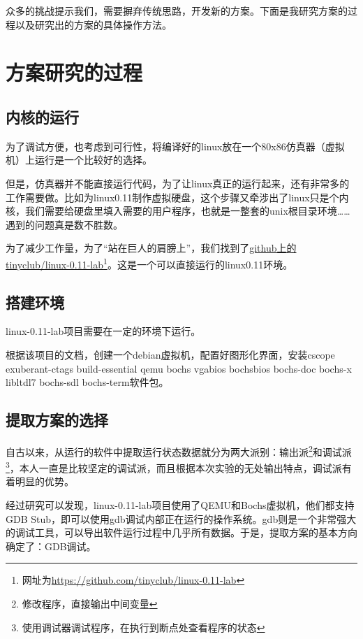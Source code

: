 \documentclass[]{report}
\begin{document}
众多的挑战提示我们，需要摒弃传统思路，开发新的方案。下面是我研究方案的过程以及研究出的方案的具体操作方法。

\section{方案研究的过程}

\subsection{内核的运行}

为了调试方便，也考虑到可行性，将编译好的linux放在一个80x86仿真器（虚拟机）上运行是一个比较好的选择。

但是，仿真器并不能直接运行代码，为了让linux真正的运行起来，还有非常多的工作需要做。比如为linux0.11制作虚拟硬盘，这个步骤又牵涉出了linux只是个内核，我们需要给硬盘里填入需要的用户程序，也就是一整套的unix根目录环境……遇到的问题真是数不胜数。

为了减少工作量，为了“站在巨人的肩膀上”，我们找到了\href{https://github.com/tinyclub/linux-0.11-lab}{github上的tinyclub/linux-0.11-lab}\footnote{网址为\url{https://github.com/tinyclub/linux-0.11-lab}}。这是一个可以直接运行的linux0.11环境。

\subsection{搭建环境}

linux-0.11-lab项目需要在一定的环境下运行。

根据该项目的文档，创建一个debian虚拟机，配置好图形化界面，安装cscope exuberant-ctags build-essential qemu bochs vgabios bochsbios bochs-doc bochs-x libltdl7 bochs-sdl bochs-term软件包。

\subsection{提取方案的选择}

自古以来，从运行的软件中提取运行状态数据就分为两大派别：输出派\footnote{修改程序，直接输出中间变量}和调试派\footnote{使用调试器调试程序，在执行到断点处查看程序的状态}，本人一直是比较坚定的调试派，而且根据本次实验的无处输出特点，调试派有着明显的优势。

经过研究可以发现，linux-0.11-lab项目使用了QEMU和Bochs虚拟机，他们都支持GDB Stub，即可以使用gdb调试内部正在运行的操作系统。gdb则是一个非常强大的调试工具，可以导出软件运行过程中几乎所有数据。于是，提取方案的基本方向确定了：GDB调试。
\end{document}
